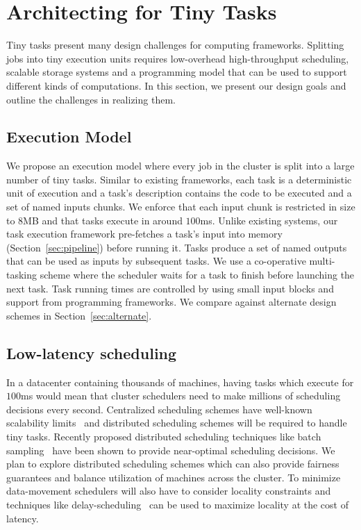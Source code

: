 \section{Architecting for Tiny Tasks}
Tiny tasks present many design challenges for computing frameworks.
Splitting jobs into tiny execution units requires low-overhead
high-throughput scheduling, scalable storage systems and a programming model
that can be used to support different kinds of computations.
In this section, we present our design goals and outline the challenges in
realizing them.

\subsection{Execution Model}
We propose an execution model where every job in the cluster is split into a
large number of tiny tasks. Similar to existing frameworks, each task is a
deterministic unit of execution and a task's description contains the code to be
executed and a set of named inputs chunks. We enforce that each input chunk is
restricted in size to 8MB and that tasks execute in around $100$ms.  Unlike
existing systems, our task execution framework pre-fetches a task's input into
memory (Section~\ref{sec:pipeline}) before running it. Tasks produce a set of named
outputs that can be used as inputs by subsequent tasks. We use a co-operative
multi-tasking scheme where the scheduler waits for a task to finish before launching
the next task.  Task running times are controlled by using small input blocks
and support from programming frameworks. We compare against alternate design
schemes in Section~\ref{sec:alternate}.

\subsection{Low-latency scheduling}
In a datacenter containing thousands of machines, having tasks which execute for
$100$ms would mean that cluster schedulers need to make millions of scheduling
decisions every second. Centralized scheduling schemes have well-known
scalability limits~\cite{john-wilkes-berkeley} and distributed scheduling
schemes will be required to handle tiny tasks. Recently proposed distributed
scheduling techniques like batch sampling~\cite{sparrow} have been shown to
provide near-optimal scheduling decisions. We plan to explore distributed
scheduling schemes which can also provide fairness guarantees and balance
utilization of machines across the cluster. To minimize data-movement
schedulers will also have to consider locality constraints
and techniques like delay-scheduling~\cite{delay} can be used to maximize locality at the
cost of latency.


